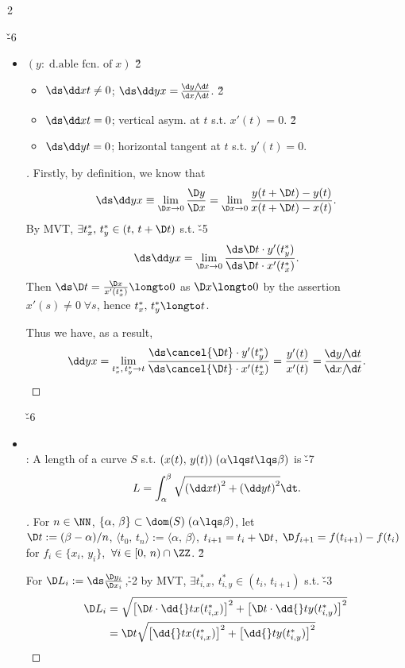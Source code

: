 \documentclass[dvipdfmx,a4paper,titlepage,9pt]{jsarticle}
\begin{document}
\begin{multicols*}{2}
\vfill\null
\columnbreak

\v{-6}
\begin{itemize}
\item[-]  $(y\!:\;\text{d.able fcn. of}\;x)$ \v2
\begin{itemize}
\setlength{\leftskip}{-10pt}
\item[$\cdot$] $\ds\dd xt\neq0$;\; $\ds\dd yx=\frac{\!\d y/\!\d t}{\!\d x/\!\d t}$. \v2
\item[$\cdot$] $\ds\dd xt=0$;\; vertical asym.\! at $t$ s.t. $x'(t)=0$. \v2
\item[$\cdot$] $\ds\dd yt=0$;\; horizontal tangent at $t$ s.t. $y'(t)=0$.
\end{itemize}

\begin{pfbox}
\begin{proof}[]
Firstly, by definition, we know that $$\ds\dd yx\equiv\lim_{\D x\to0}\frac{\D y}{\D x}=\lim_{\D x\to0}\frac{y(t+\D t)-y(t)}{x(t+\D t)-x(t)}.$$
By MVT, $\exists t^*_x,\,t^*_y\in(t,\,t+\D t)$ s.t. \v{-5}
$$\ds\dd yx=\lim_{\D x\to0}\frac{\ds\D t\cdot y'(t^*_y)}{\ds\D t\cdot x'(t^*_x)}.$$
Then $\ds\D t=\frac{\D x}{x'(t^*_x)}\longto 0$ as $\D x\longto0$ by the assertion $x'(s)\neq0\;\forall s$, hence $t_x^*,\,t_y^*\longto t$.

Thus we have, as a result,
$$\dd yx=\lim_{t_x^*,\,t_y^*\to t}\frac{\ds\cancel{\D t}\cdot y'(t^*_y)}{\ds\cancel{\D t}\cdot x'(t^*_x)}=\frac{y'(t)}{x'(t)}=\frac{\!\d y/\!\d t}{\!\d x/\!\d t}.$$
\end{proof}
\end{pfbox}

\; \v{-6}

\item[-]  \\
: A length of a curve $S$ s.t.\! $(x(t),\,y(t))\;(\alpha\lqs t\lqs\beta)$ is \v{-7}
$$L=\int_\alpha^\beta\sqrt{\left(\dd xt\right)^2+\left(\dd yt\right)^2}\dt.$$

\begin{pfbox}
\begin{proof}[]
For $n\in\NN$, $\{\alpha,\,\beta\}\subset\dom(S)\;(\alpha\lqs\beta)$, let\\
$\D t:=(\beta-\alpha)/n$, $\langle t_0,\,t_n\rangle:=\langle\alpha,\,\beta\rangle$, $t_{i+1}=t_i+\D t$, $\D f_{i+1}=f(t_{i+1})-f(t_i)$ for $f_i\in\{x_i,\,y_i\}$, $\,\forall i\in[0,\,n)\cap\ZZ$. \v2

For $\D L_i:=\ds\frac{\D y_i}{\D x_i}$,\h{-2} by MVT, 
$\exists t^*_{i,x},\,t^*_{i,y}\in(t_i,\,t_{i+1})$ s.t. \v{-3}
$$\begin{aligned}
  \!\D L_i&=\sqrt{\left[\D t\cdot \dd{}tx(t^*_{i,x})\right]^2+\left[\D t\cdot \dd{}ty(t^*_{i,y})\right]^2} \\
        &=\D t\sqrt{\left[\dd{}tx(t^*_{i,x})\right]^2+\left[\dd{}ty(t^*_{i,y})\right]^2}
  \end{aligned}$$


\end{proof}
\end{pfbox}
\end{itemize}
\end{multicols*}
\end{document}
